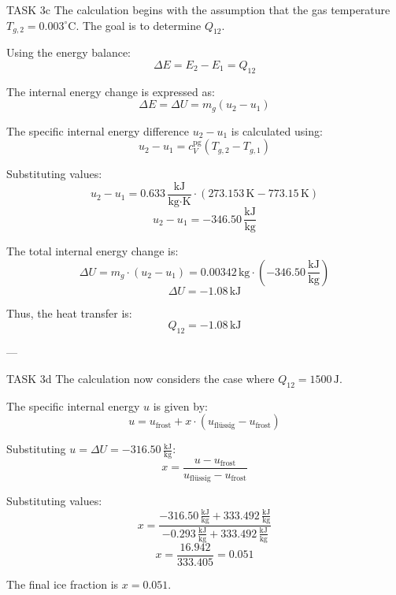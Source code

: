 TASK 3c  
The calculation begins with the assumption that the gas temperature \( T_{g,2} = 0.003^\circ\text{C} \). The goal is to determine \( Q_{12} \).  

Using the energy balance:  
\[
\Delta E = E_2 - E_1 = Q_{12}
\]  

The internal energy change is expressed as:  
\[
\Delta E = \Delta U = m_g (u_2 - u_1)
\]  

The specific internal energy difference \( u_2 - u_1 \) is calculated using:  
\[
u_2 - u_1 = c_V^{\text{pg}} (T_{g,2} - T_{g,1})
\]  

Substituting values:  
\[
u_2 - u_1 = 0.633 \, \frac{\text{kJ}}{\text{kg·K}} \cdot (273.153 \, \text{K} - 773.15 \, \text{K})
\]  
\[
u_2 - u_1 = -346.50 \, \frac{\text{kJ}}{\text{kg}}
\]  

The total internal energy change is:  
\[
\Delta U = m_g \cdot (u_2 - u_1) = 0.00342 \, \text{kg} \cdot (-346.50 \, \frac{\text{kJ}}{\text{kg}})
\]  
\[
\Delta U = -1.08 \, \text{kJ}
\]  

Thus, the heat transfer is:  
\[
Q_{12} = -1.08 \, \text{kJ}
\]  

---

TASK 3d  
The calculation now considers the case where \( Q_{12} = 1500 \, \text{J} \).  

The specific internal energy \( u \) is given by:  
\[
u = u_{\text{frost}} + x \cdot (u_{\text{flüssig}} - u_{\text{frost}})
\]  

Substituting \( u = \Delta U = -316.50 \, \frac{\text{kJ}}{\text{kg}} \):  
\[
x = \frac{u - u_{\text{frost}}}{u_{\text{flüssig}} - u_{\text{frost}}}
\]  

Substituting values:  
\[
x = \frac{-316.50 \, \frac{\text{kJ}}{\text{kg}} + 333.492 \, \frac{\text{kJ}}{\text{kg}}}{-0.293 \, \frac{\text{kJ}}{\text{kg}} + 333.492 \, \frac{\text{kJ}}{\text{kg}}}
\]  
\[
x = \frac{16.942}{333.405} = 0.051
\]  

The final ice fraction is \( x = 0.051 \).
